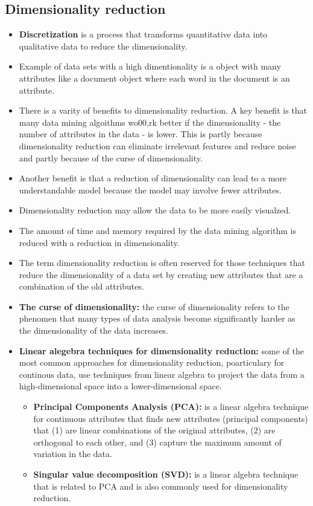 	\subsection{Dimensionality reduction}
		\begin{itemize}
			\item {\bf Discretization} is a process that transforms quantitative data into qualitative data
			to reduce the dimensionality.
			\item Example of data sets with a high dimentionality is a object with many
			attributes like a document object where each word in the document is an 
			attribute. 
			\item There is a varity of benefits to dimensionality reduction. A key benefit 
			is that many data mining algoithms wo00,rk better if the dimensionality - 
			the number of attributes in the data - is lower. This is partly because 
			dimensionality reduction can eliminate irrelevant features and reduce noise and
			partly because of the curse of dimensionality.
			\item Another benefit is that a reduction of dimensionality can lead to a more
			understandable model because the model may involve fewer attributes.
			\item Dimensionality reduction may allow the data to be more easily visualzed.
			\item The amount of time and memory required by the data mining algorithm is reduced 
			with a reduction in dimensionality. 
			\item The term dimensionality reduction is often reserved for those techniques
			that reduce the dimensionality of a data set by creating new attributes that
			are a combination of the old attributes. 
			\item {\bf The curse of dimensionality:} the curse of dimensionality refers
			to the phenomen that many types of data analysis become significantly harder
			as the dimensionality of the data increases. 
			\item {\bf Linear alegebra techniques for dimensionality reduction:} some
			of the most common approaches for dimensionality reduction, poarticulary for
			continous data, use techniques from linear algebra to project the data from a 
			high-dimensional space into a lower-dimensional space. 
				\begin{itemize}
					\item {\bf Principal Components Analysis (PCA):} is a linear algebra technique 
					for continuous attributes that finds new attributes (principal components)
					that (1) are linear combinations of the original attributes, 
					(2) are orthogonal to each other, and (3) capture the maximum amount of 
					variation in the data. 
					\item {\bf Singular value decomposition (SVD): } is a linear algebra
					technique that is related to PCA and is also commonly used for
					dimensionality reduction.
				\end{itemize}
		\end{itemize}

